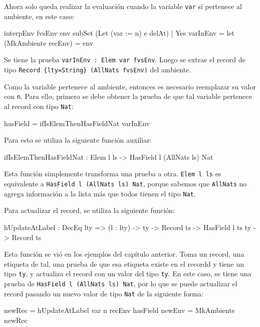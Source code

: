 Ahora solo queda realizar la evaluación cuando la variable \texttt{var} sí pertenece al ambiente, en este caso:

\begin{code}
interpEnv {fvsEnv} env subSet (Let (var := n) e delAt)
  | Yes varInEnv =
  let (MkAmbiente recEnv) = env
\end{code}

Se tiene la prueba \texttt{varInEnv : Elem var fvsEnv}. Luego se extrae el record de tipo \texttt{Record \{lty=String\} (AllNats fvsEnv)} del ambiente.

Como la variable pertenece al ambiente, entonces es necesario reemplazar su valor con \texttt{n}. Para ello, primero se debe obtener la prueba de que tal variable pertenece al record con tipo \texttt{Nat}:

\begin{code}
hasField = ifIsElemThenHasFieldNat varInEnv
\end{code}

Para esto se utiliza la siguiente función auxiliar:

\begin{code}
ifIsElemThenHasFieldNat : Elem l ls -> HasField l (AllNats ls) Nat
\end{code}

Esta función simplemente transforma una prueba a otra. \texttt{Elem l ls} es equivalente a \texttt{HasField l (AllNats ls) Nat}, porque sabemos que \texttt{AllNats} no agrega información a la lista más que todos tienen el tipo \texttt{Nat}.

Para actualizar el record, se utiliza la siguiente función:

\begin{code}
hUpdateAtLabel : DecEq lty => (l : lty) ->
  ty -> Record ts -> HasField l ts ty -> Record ts
\end{code}

Esta función se vió en los ejemplos del capítulo anterior. Toma un record, una etiqueta de tal, una prueba de que esa etiqueta existe en el recordd y tiene un tipo \texttt{ty}, y actualiza el record con un valor del tipo \texttt{ty}. En este caso, se tiene una prueba de \texttt{HasField l (AllNats ls) Nat}, por lo que se puede actualizar el record pasando un nuevo valor de tipo \texttt{Nat} de la siguiente forma:

\begin{code}
newRec = hUpdateAtLabel var n recEnv hasField
newEnv = MkAmbiente newRec
\end{code}

